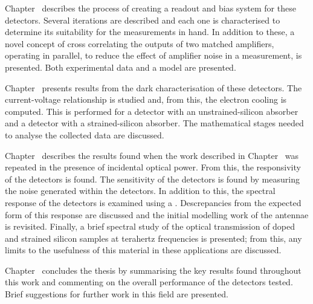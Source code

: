 \par 
Chapter~ describes the process of creating a readout and bias system for these detectors. Several iterations are described and each one is characterised to determine its suitability for the measurements in hand. In addition to these, a novel concept of cross correlating the outputs of two matched amplifiers, operating in parallel, to reduce the effect of amplifier noise in a measurement, is presented. Both experimental data and a model are presented.
\par 
Chapter~ presents results from the dark characterisation of these detectors. The current-voltage relationship is studied and, from this, the electron cooling is computed. This is performed for a detector with an unstrained-silicon absorber and a detector with a strained-silicon absorber. The mathematical stages needed to analyse the collected data are discussed.
\par 
Chapter~ describes the results found when the work described in Chapter~ was repeated in the presence of incidental optical power. From this, the responsivity of the detectors is found. The sensitivity of the detectors is found by measuring the noise generated within the detectors. In addition to this, the spectral response of the detectors is examined using a . Descrepancies from the expected form of this response are discussed and the initial modelling work of the antennae is revisited. Finally, a brief spectral study of the optical transmission of doped and strained silicon samples at terahertz frequencies is presented; from this, any limits to the usefulness of this material in these applications are discussed.
\par 
Chapter~ concludes the thesis by summarising the key results found throughout this work and commenting on the overall performance of the detectors tested. Brief suggestions for further work in this field are presented.







